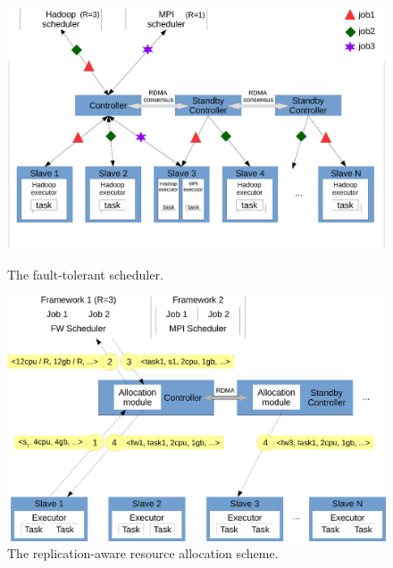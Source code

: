 \begin{figure}[!htb]
    \begin{minipage}{.49\textwidth}
        \vspace{-.2in}
        \includegraphics[width=0.34\textheight]{figures/scheduler_arch.eps}
        \vspace{-.25in}
        \caption{The \tripod fault-tolerant scheduler.}
        \label{fig:scheduler-arch}
    \end{minipage}
    \begin{minipage}{0.51\textwidth}
        \vspace{-.2in}
        \includegraphics[width=0.34\textheight]{figures/scheduler_flow.eps}
        \vspace{-.05in}
        \caption{The replication-aware resource allocation scheme.}
        \label{fig:scheduler-workflow}
    \end{minipage}
\end{figure}

